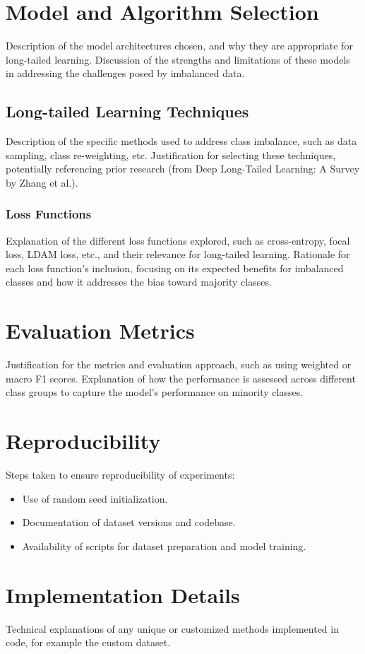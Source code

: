 \section{Model and Algorithm Selection}
Description of the model architectures chosen, and why they are appropriate for long-tailed learning.
Discussion of the strengths and limitations of these models in addressing the challenges posed by imbalanced data.

\subsection{Long-tailed Learning Techniques}
Description of the specific methods used to address class imbalance, such as data sampling, class re-weighting, etc. 
Justification for selecting these techniques, potentially referencing prior research (from Deep Long-Tailed Learning: A Survey by Zhang et al.).


\subsubsection{Loss Functions}
Explanation of the different loss functions explored, such as cross-entropy, focal loss, LDAM loss, etc., and their relevance for long-tailed learning.
Rationale for each loss function's inclusion, focusing on its expected benefits for imbalanced classes and how it addresses the bias toward majority classes.



\section{Evaluation Metrics}
Justification for the metrics and evaluation approach, such as using weighted or macro F1 scores.
Explanation of how the performance is assessed across different class groups to capture the model’s performance on minority classes.

\section{Reproducibility}
Steps taken to ensure reproducibility of experiments:
\begin{itemize}
    \item Use of random seed initialization.
    \item Documentation of dataset versions and codebase.
    \item Availability of scripts for dataset preparation and model training.
\end{itemize}

\section{Implementation Details}
Technical explanations of any unique or customized methods implemented in code, for example the custom dataset.


